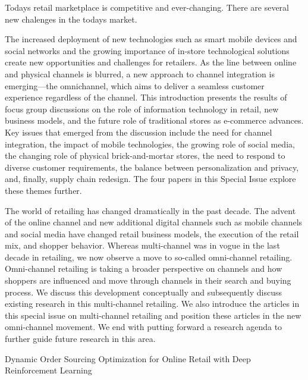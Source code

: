 Todays retail marketplace is competitive and ever-changing. There are several new chalenges in the todays market.



\citep{piotrowicz2014introduction}

The increased deployment of new technologies such as smart mobile devices and social networks and the growing importance of in-store technological solutions create new opportunities and challenges for retailers. As the line between online and physical channels is blurred, a new approach to channel integration is emerging—the omnichannel, which aims to deliver a seamless customer experience regardless of the channel. This introduction presents the results of focus group discussions on the role of information technology in retail, new business models, and the future role of traditional stores as e-commerce advances. Key issues that emerged from the discussion include the need for channel integration, the impact of mobile technologies, the growing role of social media, the changing role of physical brick-and-mortar stores, the need to respond to diverse customer requirements, the balance between personalization and privacy, and, finally, supply chain redesign. The four papers in this Special Issue explore these themes further.

\citep{verhoef2015multi}

The world of retailing has changed dramatically in the past decade. The advent of the online channel and new additional digital channels such as mobile channels and social media have changed retail business models, the execution of the retail mix, and shopper behavior. Whereas multi-channel was in vogue in the last decade in retailing, we now observe a move to so-called omni-channel retailing. Omni-channel retailing is taking a broader perspective on channels and how shoppers are influenced and move through channels in their search and buying process. We discuss this development conceptually and subsequently discuss existing research in this multi-channel retailing. We also introduce the articles in this special issue on multi-channel retailing and position these articles in the new omni-channel movement. We end with putting forward a research agenda to further guide future research in this area.



Dynamic Order Sourcing Optimization for Online Retail with Deep Reinforcement Learning
